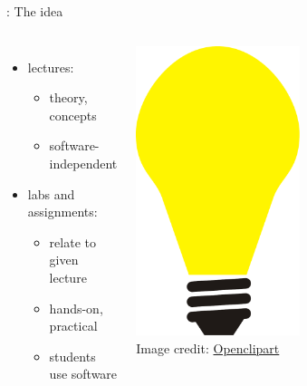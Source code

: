 \documentclass[xcolor={dvipsnames,usenames},beamer,aspectratio=169]{beamer}
\begin{document}
\begin{frame}{\geoforalllab: The idea}

\begin{columns}[c]


\begin{itemize}
 \item lectures:
 \begin{itemize}
  \item theory, concepts
  \item software-independent
 \end{itemize}
 \item labs and assignments:
 \begin{itemize}
  \item relate to given lecture
  \item hands-on, practical
  \item students use software
 \end{itemize}
\end{itemize}


\bigskip

\centering
\includegraphics[width=0.5\textwidth]{./images/general/bulp}%
\\
\tiny
\color{gray}
Image credit: \href{https://openclipart.org}{Openclipart}

\end{columns}

\end{frame}
\end{document}
